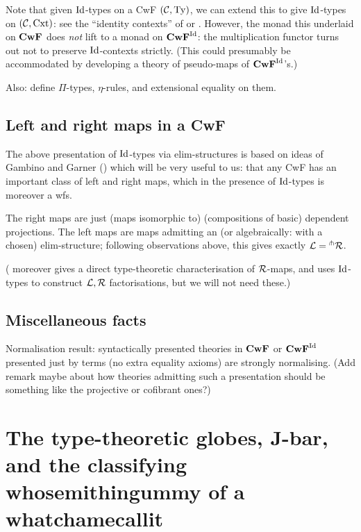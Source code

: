 \documentclass{amsart}
\begin{document}
Note that given $\mathrm{Id}$-types on a CwF $(\mathcal{C},\mathrm{Ty})$, we can extend this to give $\mathrm{Id}$-types on $(\mathcal{C},\mathrm{Cxt})$: see the ``identity contexts'' of \cite{streicher:habilitationsthesis} or \cite{garner-gambino}.  However, the monad this underlaid on $\mathbf{CwF}$ does \emph{not} lift to a monad on $\mathbf{CwF}^{\mathrm{Id}}$: the multiplication functor turns out not to preserve $\mathrm{Id}$-contexts strictly.  (This could presumably be accommodated by developing a theory of pseudo-maps of $\mathbf{CwF}^{\mathrm{Id}}$'s.)

Also: define $\Pi$-types, $\eta$-rules, and extensional equality on them. 

\subsection{Left and right maps in a CwF} \label{subsec:left-right-in-cwf}
The above presentation of $\mathrm{Id}$-types via elim-structures is based on ideas of Gambino and Garner (\cite{gambino-garner}) which will be very useful to us: that any CwF has an important class of left and right maps, which in the presence of $\mathrm{Id}$-types is moreover a wfs.

The right maps are just (maps isomorphic to) (compositions of basic) dependent projections.  The left maps are maps admitting an (or algebraically: with a chosen) elim-structure; following observations above, this gives exactly $\mathcal{L} = {}^\pitchfork \mathcal{R}$.  

(\cite{gambino-garner} moreover gives a direct type-theoretic characterisation of $\mathcal{R}$-maps, and uses $\mathrm{Id}$-types to construct $\mathcal{L},\mathcal{R}$ factorisations, but we will not need these.)

\subsection{Miscellaneous facts}

Normalisation result: syntactically presented theories in $\mathbf{CwF}$ or $\mathbf{CwF}^{\mathrm{Id}}$ presented just by terms (no extra equality axioms) are strongly normalising.  (Add remark maybe about how theories admitting such a presentation should be something like the projective or cofibrant ones?)
















\section{The type-theoretic globes, J-bar, and the classifying whosemithingummy of a whatchamecallit}
\end{document}

